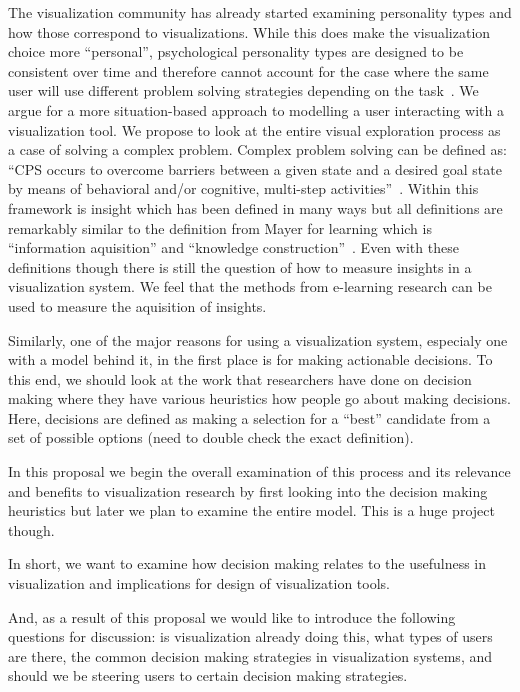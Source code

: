 The visualization community has already started examining personality types and
how those correspond to visualizations. While this does make the visualization
choice more ``personal'', psychological personality types are designed to be
consistent over time and therefore cannot account for the case where the same
user will use different problem solving strategies depending on the
task~\citep{ref}. We argue for a more situation-based approach to modelling a
user interacting with a visualization tool. We propose to look at the entire
visual exploration process as a case of solving a complex problem. Complex
problem solving can be defined as: ``CPS occurs to overcome barriers between a
given state and a desired goal state by means of behavioral and/or cognitive,
multi-step activities''~\citep{Frensch:2005}. Within this framework is insight
which has been defined in many ways but all definitions are remarkably similar
to the definition from Mayer for learning which is ``information aquisition''
and ``knowledge construction''~\citep{ref}. Even with these definitions though
there is still the question of how to measure insights in a visualization
system. We feel that the methods from e-learning research can be used to
measure the aquisition of insights.

Similarly, one of the major reasons for using a visualization system,
especialy one with a model behind it, in the first place is for making
actionable decisions. To this end, we should look at the work that
researchers have done on decision making where they have various
heuristics how people go about making decisions. Here, decisions are
defined as making a selection for a ``best'' candidate from a set of
possible options (need to double check the exact definition).

In this proposal we begin the overall examination of this process and
its relevance and benefits to visualization research by first looking
into the decision making heuristics but later we plan to examine the
entire model. This is a huge project though.

In short, we want to examine how decision making relates to the usefulness in
visualization and implications for design of visualization tools.

And, as a result of this proposal we would like to introduce the following
questions for discussion: is visualization already doing this, what types of
users are there, the common decision making strategies in visualization
systems, and should we be steering users to certain decision making strategies.

